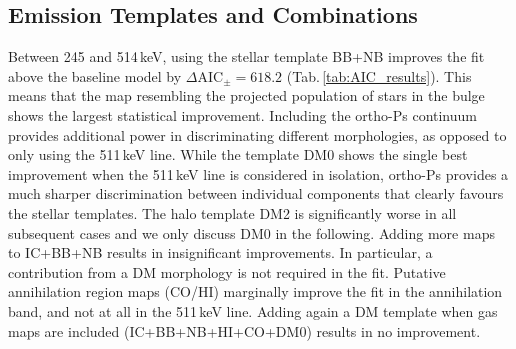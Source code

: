 \documentclass[doublespace,nopageskip]{VTthesis} %
\begin{document}
\subsection{Emission Templates and Combinations}\label{sec:maps_as_they_are}
%
Between 245 and 514\,keV, using the stellar template BB+NB improves the fit above the baseline model by $\Delta\mathrm{AIC}_{\pm} = 618.2$ (Tab.\,\ref{tab:AIC_results}). 
%
This means that the map resembling the projected population of stars in the bulge shows the largest statistical improvement.
%
Including the ortho-Ps continuum provides additional power in discriminating different morphologies, as opposed to only using the 511\,keV line.
%
While the template DM0 shows the single best improvement when the 511\,keV line is considered in isolation, ortho-Ps provides a much sharper discrimination between individual components that clearly favours the stellar templates.
%
The halo template DM2 is significantly worse in all subsequent cases and we only discuss DM0 in the following.
%
Adding more maps to IC+BB+NB results in insignificant improvements.
%
In particular, a contribution from a DM morphology is not required in the fit.
%
Putative annihilation region maps (CO/HI) marginally improve the fit in the annihilation band, and not at all in the 511\,keV line.
%
Adding again a DM template when gas maps are included (IC+BB+NB+HI+CO+DM0) results in no improvement.
%
\end{document}
